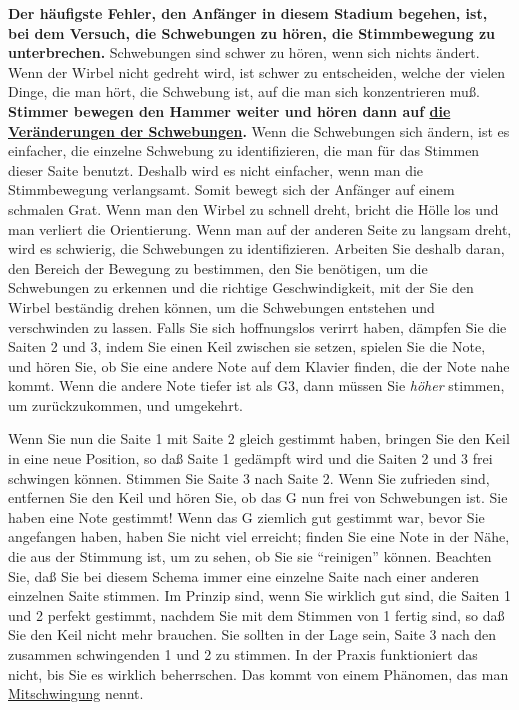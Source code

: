 \textbf{Der häufigste Fehler, den Anfänger in diesem Stadium begehen, ist, bei dem Versuch, die Schwebungen zu hören, die Stimmbewegung zu unterbrechen.}
Schwebungen sind schwer zu hören, wenn sich nichts ändert.
Wenn der Wirbel nicht gedreht wird, ist schwer zu entscheiden, welche der vielen Dinge, die man hört, die Schwebung ist, auf die man sich konzentrieren muß.
\textbf{Stimmer bewegen den Hammer weiter und hören dann auf \underline{die Veränderungen der Schwebungen}.}
Wenn die Schwebungen sich ändern, ist es einfacher, die einzelne Schwebung zu identifizieren, die man für das Stimmen dieser Saite benutzt.
Deshalb wird es nicht einfacher, wenn man die Stimmbewegung verlangsamt.
Somit bewegt sich der Anfänger auf einem schmalen Grat.
Wenn man den Wirbel zu schnell dreht, bricht die Hölle los und man verliert die Orientierung.
Wenn man auf der anderen Seite zu langsam dreht, wird es schwierig, die Schwebungen zu identifizieren.
Arbeiten Sie deshalb daran, den Bereich der Bewegung zu bestimmen, den Sie benötigen, um die Schwebungen zu erkennen und die richtige Geschwindigkeit, mit der Sie den Wirbel beständig drehen können, um die Schwebungen entstehen und verschwinden zu lassen.
Falls Sie sich hoffnungslos verirrt haben, dämpfen Sie die Saiten 2 und 3, indem Sie einen Keil zwischen sie setzen, spielen Sie die Note, und hören Sie, ob Sie eine andere Note auf dem Klavier finden, die der Note nahe kommt.
Wenn die andere Note tiefer ist als G3, dann müssen Sie \textit{höher} stimmen, um zurückzukommen, und umgekehrt.

Wenn Sie nun die Saite 1 mit Saite 2 gleich gestimmt haben, bringen Sie den Keil in eine neue Position, so daß Saite 1 gedämpft wird und die Saiten 2 und 3 frei schwingen können.
Stimmen Sie Saite 3 nach Saite 2.
Wenn Sie zufrieden sind, entfernen Sie den Keil und hören Sie, ob das G nun frei von Schwebungen ist.
Sie haben eine Note gestimmt!
Wenn das G ziemlich gut gestimmt war, bevor Sie angefangen haben, haben Sie nicht viel erreicht; finden Sie eine Note in der Nähe, die aus der Stimmung ist, um zu sehen, ob Sie sie \enquote{reinigen} können.
Beachten Sie, daß Sie bei diesem Schema immer eine einzelne Saite nach einer anderen einzelnen Saite stimmen.
Im Prinzip sind, wenn Sie wirklich gut sind, die Saiten 1 und 2 perfekt gestimmt, nachdem Sie mit dem Stimmen von 1 fertig sind, so daß Sie den Keil nicht mehr brauchen.
Sie sollten in der Lage sein, Saite 3 nach den zusammen schwingenden 1 und 2 zu stimmen.
In der Praxis funktioniert das nicht, bis Sie es wirklich beherrschen.
Das kommt von einem Phänomen, das man \hyperref[mitschwingung]{Mitschwingung} nennt.
 


